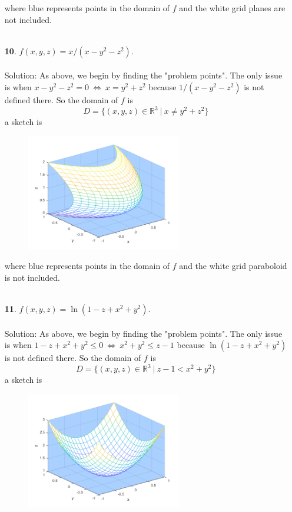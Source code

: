 \documentclass[12pt]{amsbook}
\begin{document}
\begin{enumerate}
\begin{center}
  \end{center}
  where blue represents points in the domain of $f$ and the white grid planes are not included. 
  \\
  \\
  \item[{\small\bf 10}.] $f(x,y,z)=x/(x-y^2-z^2)$.
  \\
  \\
  {\sc Solution}: As above, we begin by finding the "problem points". The only issue is when $x-y^2-z^2=0 \ \Leftrightarrow \ x=y^2+z^2$ because $1/(x-y^2-z^2)$ is not defined there. So the domain of $f$ is
  $$D=\{(x,y,z)\in \mathbb{R}^3 \ | \  x\neq y^2+z^2 \}$$ 
  a sketch is
  \begin{center}
  \includegraphics[width=3.5in,height=2.0in]{3_1_10.png}
  \end{center}
  where blue represents points in the domain of $f$ and the white grid paraboloid is not included. 
  \\
  \\
  \item[{\small\bf 11}.] $f(x,y,z)=\ln(1-z+x^2+y^2)$.
  \\
  \\
  {\sc Solution}: As above, we begin by finding the "problem points". The only issue is when $1-z+x^2+y^2 \leq 0 \ \Leftrightarrow \ x^2+y^2 \leq z -1$ because $\ln(1-z+x^2+y^2)$ is not defined there. So the domain of $f$ is
  $$D=\{(x,y,z)\in \mathbb{R}^3 \ | \  z -1 < x^2+y^2\}$$ 
  a sketch is
  \begin{center}
  \includegraphics[width=3.5in,height=2.0in]{3_1_11.png}

\end{center}
\end{enumerate}
\end{document}
